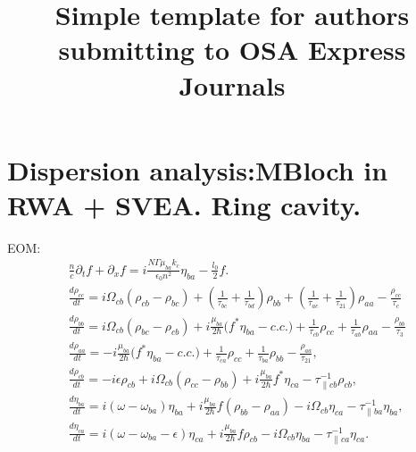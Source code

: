\documentclass[10pt,letterpaper]{article}
\begin{document}
	
	\title{Simple template for authors submitting to OSA Express Journals}
	
	
	
	\begin{thebibliography}{99}
		
	\end{thebibliography}
	
	\section{Dispersion analysis:MBloch in RWA + SVEA. Ring cavity.}
	
	EOM:
	\begin{subequations}
		\label{eq:threelevelmodel}
		\begin{align}
		&\frac{n}{c}\partial_t f + \partial_{x}f = i\frac{N \Gamma \mu_{ba} k_c}{\epsilon_0 n^2} \eta_{ba} - \frac{l_0}{2} f \label{eq:rtwave} .\\
		&\frac{d \rho_{cc}}{d t} = i\Omega_{cb} (\rho_{cb} - \rho_{bc}) + (\frac{1}{\tau_{bc}} + \frac{1}{\tau_{bd}})\rho_{bb} 
		+ (\frac{1}{\tau_{ac}} + \frac{1}{\tau_{21}})\rho_{aa} - \frac{\rho_{cc}}{\tau_{c}} \\
		&\frac{d \rho_{bb}}{d t} = i\Omega_{cb} (\rho_{bc} - \rho_{cb}) + i\frac{\mu_{ba}}{2\hbar} \big (f^*\eta_{ba}- c.c. \big )+ \frac{1}{\tau_{cb}}\rho_{cc} +  \frac{1}{\tau_{ab}}\rho_{aa} - \frac{\rho_{bb}}{\tau_{3}}  \\
		&\frac{d \rho_{aa}}{d t}  = -i\frac{\mu_{ba}}{2\hbar} \big (f^*\eta_{ba} - c.c. \big ) + \frac{1}{\tau_{ca}}\rho_{cc}  +  \frac{1}{\tau_{ba}}\rho_{bb} - \frac{\rho_{aa}}{\tau_{21}} , \\
		&\frac{d \rho_{cb}}{d t}  = -i\epsilon\rho_{cb} +i \Omega_{cb}(\rho_{cc} - \rho_{bb}) +i\frac{\mu_{ba}}{2 \hbar}f^*\eta_{ca}-\tau_{\parallel cb}^{-1} \rho_{cb},  \\
		&\frac{d \eta_{ba}}{d t}   = i(\omega - \omega_{ba})\eta_{ba} +i \frac{\mu_{ba}}{2\hbar}f(\rho_{bb}-\rho_{aa}) - i\Omega_{cb}\eta_{ca} - \tau_{\parallel ba}^{-1}\eta_{ba}, \\
		&\frac{d \eta_{ca}}{d t}  = i(\omega - \omega_{ba}-\epsilon)\eta_{ca} +i \frac{\mu_{ba}}{2\hbar}f\rho_{cb} - i\Omega_{cb}\eta_{ba} - \tau_{\parallel ca}^{-1}\eta_{ca}.
		\end{align}
	\end{subequations}
	
\end{document}
